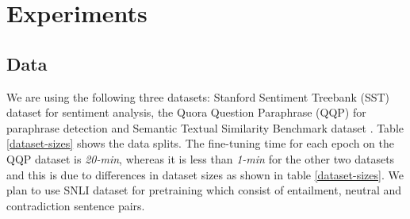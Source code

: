 \documentclass{article}
\begin{document}
\section{Experiments}

\subsection{Data}
We are using the following three datasets: Stanford Sentiment Treebank (SST) \cite{sst5} dataset for sentiment analysis, the Quora Question Paraphrase (QQP) \cite{qqp} for paraphrase detection and Semantic Textual Similarity Benchmark dataset \cite{stsb}. Table \ref{dataset-sizes} shows the data splits. The fine-tuning time for each epoch on the QQP dataset is \textit{20-min}, whereas it is less than \textit{1-min} for the other two datasets and this is due to differences in dataset sizes as shown in table \ref{dataset-sizes}. We plan to use SNLI dataset \cite{snli:emnlp2015} for pretraining which consist of entailment, neutral and contradiction sentence pairs.
\end{document}
